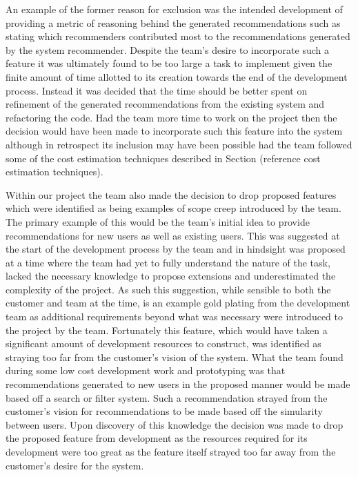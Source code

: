 \documentclass{l3proj}
\begin{document}
An example of the former reason for exclusion was the intended development of providing a metric of reasoning behind the generated recommendations such as stating which recommenders contributed most to the recommendations generated by the system recommender. Despite the team's desire to incorporate such a feature it was ultimately found to be too large a task to implement given the finite amount of time allotted to its creation towards the end of the development process. Instead it was decided that the time should be better spent on refinement of the generated recommendations from the existing system and refactoring the code. Had the team more time to work on the project then the decision would have been made to incorporate such this feature into the system although in retrospect its inclusion may have been possible had the team followed some of the cost estimation techniques described in Section (reference cost estimation techniques).

Within our project the team also made the decision to drop proposed features which were identified as being examples of scope creep introduced by the team. The primary example of this would be the team's initial idea to provide recommendations for new users as well as existing users. This was suggested at the start of the development process by the team and in hindsight was proposed at a time where the team had yet to fully understand the nature of the task, lacked the necessary knowledge to propose extensions and underestimated the complexity of the project. As such this suggestion, while sensible to both the customer and team at the time, is an example gold plating from the development team as additional requirements beyond what was necessary were introduced to the project by the team. Fortunately this feature, which would have taken a significant amount of development resources to construct, was identified as straying too far from the customer's vision of the system. What the team found during some low cost development work and prototyping was that recommendations generated to new users in the proposed manner would be made based off a search or filter system. Such a recommendation strayed from the customer's vision for recommendations to be made based off the simularity between users. Upon discovery of this knowledge the decision was made to drop the proposed feature from development as the resources required for its development were too great as the feature itself strayed too far away from the customer's desire for the system.  
\end{document}
